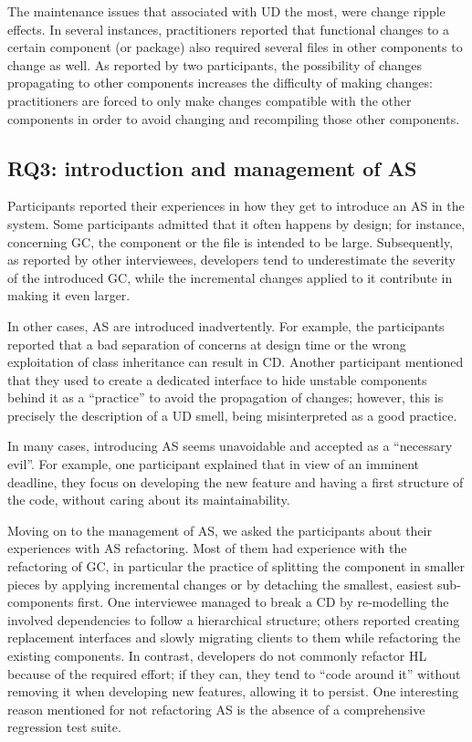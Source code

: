 The maintenance issues that associated with UD the most, were change ripple effects. In several instances, practitioners reported that functional changes to a certain component (or package) also required several files in other components to change as well. As reported by two participants, the possibility of changes propagating to other components increases the difficulty of making changes: practitioners are forced to only make changes compatible with the other components in order to avoid changing and recompiling those other components.

\subsection{RQ3: introduction and management of AS}
Participants reported their experiences in how they get to introduce an AS in the system. Some participants admitted that it often happens by design; for instance, concerning GC, the component or the file is intended to be large. Subsequently, as reported by other interviewees, developers tend to underestimate the severity of the introduced GC, while the incremental changes applied to it contribute in making it even larger. 

In other cases, AS are introduced inadvertently. For example, the participants reported that a bad separation of concerns at design time or the wrong exploitation of class inheritance can result in CD. Another participant mentioned that they used to create a dedicated interface to hide unstable components behind it as a “practice” to avoid the propagation of changes; however, this is precisely the description of a UD smell, being misinterpreted as a good practice.

In many cases, introducing AS seems unavoidable and accepted as a “necessary evil”. For example, one participant explained that in view of an imminent deadline, they focus on developing the new feature and having a first structure of the code, without caring about its maintainability. 

Moving on to the management of AS, we asked the participants about their experiences with AS refactoring. Most of them had experience with the refactoring of GC, in particular the practice of splitting the component in smaller pieces by applying incremental changes or by detaching the smallest, easiest sub-components first. One interviewee managed to break a CD by re-modelling the involved dependencies to follow a hierarchical structure; others reported creating replacement interfaces and slowly migrating clients to them while refactoring the existing components. In contrast, developers do not commonly refactor HL because of the required effort; if they can, they tend to “code around it” without removing it when developing new features, allowing it to persist. One interesting reason mentioned for not refactoring AS is the absence of a comprehensive regression test suite.

